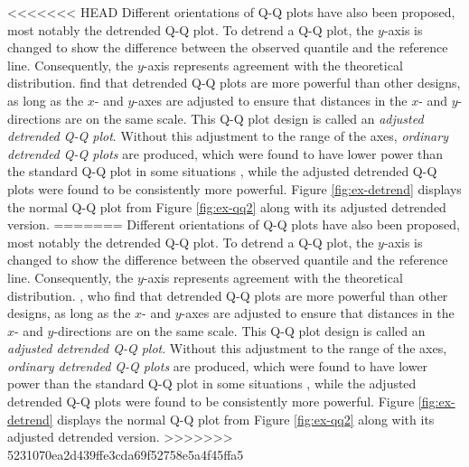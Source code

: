 \textless{}\textless{}\textless{}\textless{}\textless{}\textless{}\textless{}
HEAD Different orientations of Q-Q plots have also been proposed, most
notably the detrended Q-Q plot. To detrend a Q-Q plot, the \(y\)-axis is
changed to show the difference between the observed quantile and the
reference line. Consequently, the \(y\)-axis represents agreement with
the theoretical distribution. \citet{Loy2016-fg} find that detrended Q-Q
plots are more powerful than other designs, as long as the \(x\)- and
\(y\)-axes are adjusted to ensure that distances in the \(x\)- and
\(y\)-directions are on the same scale. This Q-Q plot design is called
an \emph{adjusted detrended Q-Q plot}. Without this adjustment to the
range of the axes, \emph{ordinary detrended Q-Q plots} are produced,
which were found to have lower power than the standard Q-Q plot in some
situations \citep{Loy2016-fg}, while the adjusted detrended Q-Q plots
were found to be consistently more powerful. Figure \ref{fig:ex-detrend}
displays the normal Q-Q plot from Figure \ref{fig:ex-qq2} along with its
adjusted detrended version. ======= Different orientations of Q-Q plots
have also been proposed, most notably the detrended Q-Q plot. To detrend
a Q-Q plot, the \(y\)-axis is changed to show the difference between the
observed quantile and the reference line. Consequently, the \(y\)-axis
represents agreement with the theoretical distribution.
 \citet{Loy2016-fg}, who find that
detrended Q-Q plots are more powerful than other designs, as long as the
\(x\)- and \(y\)-axes are adjusted to ensure that distances in the
\(x\)- and \(y\)-directions are on the same scale. This Q-Q plot design
is called an \emph{adjusted detrended Q-Q plot}. Without this adjustment
to the range of the axes, \emph{ordinary detrended Q-Q plots} are
produced, which were found to have lower power than the standard Q-Q
plot in some situations \citep{Loy2016-fg}, while the adjusted detrended
Q-Q plots were found to be consistently more powerful. Figure
\ref{fig:ex-detrend} displays the normal Q-Q plot from Figure
\ref{fig:ex-qq2} along with its adjusted detrended version.
\textgreater{}\textgreater{}\textgreater{}\textgreater{}\textgreater{}\textgreater{}\textgreater{}
5231070ea2d439ffe3cda69f52758e5a4f45ffa5

